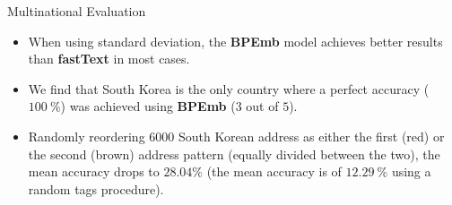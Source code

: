 \documentclass{beamer}
\begin{document}
	\begin{frame}{Multinational Evaluation}
		\begin{itemize}
			\item<1-> When using standard deviation, the \textbf{BPEmb} model achieves better results than \textbf{fastText} in most cases. 
			\item<2-> We find that South Korea is the only country where a perfect accuracy ($100~\%$) was achieved using \textbf{BPEmb} ($3$ out of $5$). 
			\item<3-> Randomly reordering $6000$ South Korean address as either the first (red) or the second (brown) address pattern (equally divided between the two), the mean accuracy drops to $28.04\%$ (the mean accuracy is of $12.29~\%$ using a random tags procedure).
		\end{itemize}
	\end{frame}
\end{document}
